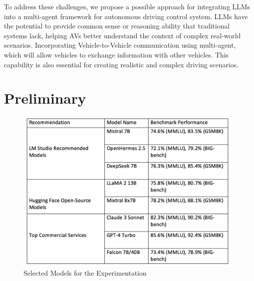 \documentclass[conference]{IEEEtran}
\begin{document}
To address these challenges, we propose a possible approach for integrating LLMs into a multi-agent framework for autonomous driving control system. LLMs have the potential to provide common sense or reasoning ability that traditional systems lack, helping AVs better understand the context of complex real-world scenarios. Incorporating Vehicle-to-Vehicle communication using multi-agent, which will allow vehicles to exchange information with other vehicles. This capability is also essential for creating realistic and complex driving scenarios.

\section{Preliminary}

\begin{figure}[h]
    \centering
\includegraphics[width=.9\linewidth]{Fig/Selected_LLM.png}
    \caption{Selected Models for the Experimentation}
    \label{fig:enter-label}
\end{figure}
\end{document}
